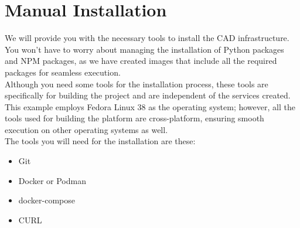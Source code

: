 \section{Manual Installation}
\label{appendix:appendix_a}

We will provide you with the necessary tools to install the CAD infrastructure.
You won't have to worry about managing the installation of Python packages and NPM packages,
as we have created images that include all the required packages for seamless execution. \\

Although you need some tools for the installation process,
these tools are specifically for building the project and are independent of the services created. \\

This example employs Fedora Linux 38 as the operating system; however,
all the tools used for building the platform are cross-platform, ensuring smooth execution on other operating systems as well. \\

The tools you will need for the installation are these:

\begin{itemize}
  \item Git
  \item Docker or Podman
  \item docker-compose
  \item CURL
\end{itemize}
